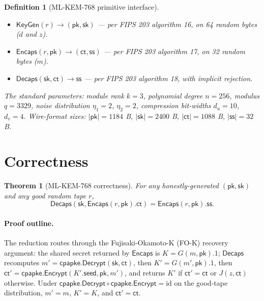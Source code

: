 \documentclass[11pt,a4paper]{article}
\newtheorem{theorem}{Theorem}[section]
\newtheorem{definition}{Definition}[section]
\begin{document}
\begin{definition}[ML-KEM-768 primitive interface]\label{def:mlkem-iface}
\begin{itemize}
\item $\mathsf{KeyGen}(r) \to (\mathsf{pk}, \mathsf{sk})$
  --- per FIPS 203 algorithm 16, on 64 random bytes ($d$ and $z$).
\item $\mathsf{Encaps}(r, \mathsf{pk}) \to (\mathsf{ct},
  \mathsf{ss})$ --- per FIPS 203 algorithm 17, on 32 random bytes
  ($m$).
\item $\mathsf{Decaps}(\mathsf{sk}, \mathsf{ct}) \to \mathsf{ss}$
  --- per FIPS 203 algorithm 18, with implicit rejection.
\end{itemize}
The standard parameters: module rank $k=3$, polynomial degree
$n=256$, modulus $q=3329$, noise distribution
$\eta_1=2$, $\eta_2=2$, compression bit-widths $d_u=10$, $d_v=4$.
Wire-format sizes: $|\mathsf{pk}|=1184$ B, $|\mathsf{sk}|=2400$ B,
$|\mathsf{ct}|=1088$ B, $|\mathsf{ss}|=32$ B.
\end{definition}

\section{Correctness}\label{sec:correctness}

\begin{theorem}[ML-KEM-768 correctness]\label{thm:mlkem-correctness}
For any honestly-generated $(\mathsf{pk}, \mathsf{sk})$ and any
good random tape $r$,
\[
  \mathsf{Decaps}(\mathsf{sk}, \mathsf{Encaps}(r,
    \mathsf{pk}).\mathsf{ct})
  = \mathsf{Encaps}(r, \mathsf{pk}).\mathsf{ss}.
\]
\end{theorem}

\paragraph{Proof outline.} The reduction routes through the
Fujisaki-Okamoto-K (FO-K) recovery argument: the shared secret
returned by $\mathsf{Encaps}$ is $K = G(m, \mathsf{pk}).1$;
$\mathsf{Decaps}$ recomputes $m' = \mathsf{cpapke.Decrypt}(\mathsf{sk},
\mathsf{ct})$, then $K' = G(m', \mathsf{pk}).1$, then
$\mathsf{ct}' = \mathsf{cpapke.Encrypt}(K'.\mathsf{seed},
\mathsf{pk}, m')$, and returns $K'$ if $\mathsf{ct}' = \mathsf{ct}$
or $J(z, \mathsf{ct})$ otherwise. Under
$\mathsf{cpapke.Decrypt} \circ \mathsf{cpapke.Encrypt} = \mathrm{id}$
on the good-tape distribution, $m' = m$, $K' = K$, and
$\mathsf{ct}' = \mathsf{ct}$.
\end{document}
